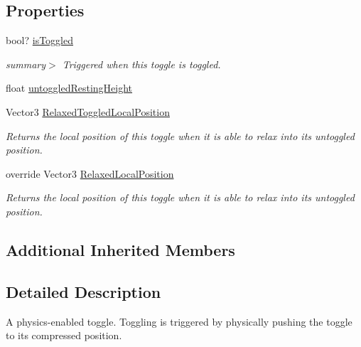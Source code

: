 \subsection*{Properties}
\begin{DoxyCompactItemize}
\item 
bool? \mbox{\hyperlink{class_leap_1_1_unity_1_1_interaction_1_1_interaction_toggle_a02368504664d3a79e06e0ad9f0775e6f}{is\+Toggled}}
\begin{DoxyCompactList}\small\item\em summary$>$ Triggered when this toggle is toggled. \end{DoxyCompactList}\item 
float \mbox{\hyperlink{class_leap_1_1_unity_1_1_interaction_1_1_interaction_toggle_aef60cd4161e0cecc20905b5b610a8ab7}{untoggled\+Resting\+Height}}
\item 
Vector3 \mbox{\hyperlink{class_leap_1_1_unity_1_1_interaction_1_1_interaction_toggle_a0aa93471870ce44e62c499437ad7f34c}{Relaxed\+Toggled\+Local\+Position}}
\begin{DoxyCompactList}\small\item\em Returns the local position of this toggle when it is able to relax into its untoggled position. \end{DoxyCompactList}\item 
override Vector3 \mbox{\hyperlink{class_leap_1_1_unity_1_1_interaction_1_1_interaction_toggle_a5bea9ebaa3eacfbf60cec56df5c73f32}{Relaxed\+Local\+Position}}
\begin{DoxyCompactList}\small\item\em Returns the local position of this toggle when it is able to relax into its untoggled position. \end{DoxyCompactList}\end{DoxyCompactItemize}
\subsection*{Additional Inherited Members}


\subsection{Detailed Description}
A physics-\/enabled toggle. Toggling is triggered by physically pushing the toggle to its compressed position. 



